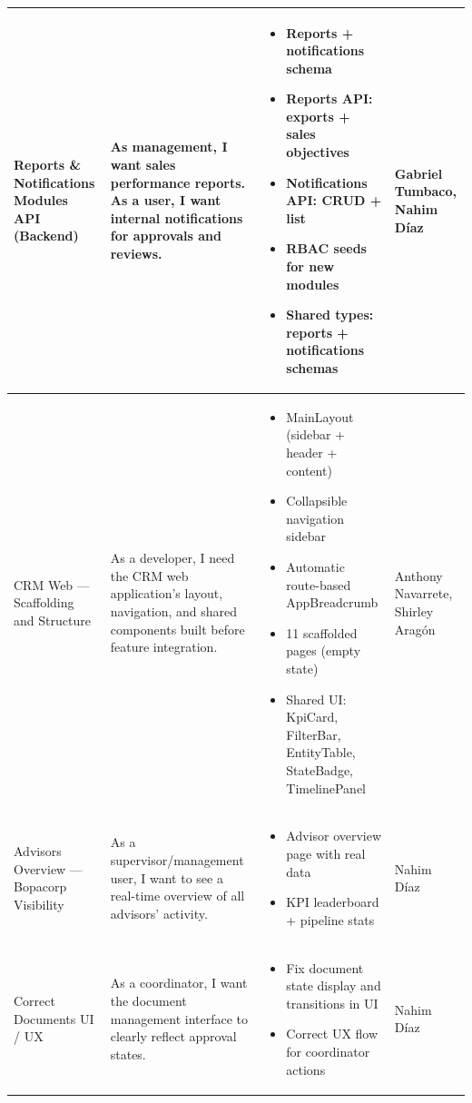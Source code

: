 \documentclass[letterpaper%
, oneside%
, 12pt%
, memoireprojet%
, english%
,creativecommons,hyperref, withAlgo2e %
]{thETS}
\begin{document}
\begin{longtable}{|p{3.2cm}|p{4.4cm}|p{5.4cm}|p{3.0cm}|}
Reports \& Notifications Modules API (Backend) & As management, I want sales performance reports. As a user, I want internal notifications for approvals and reviews. & \begin{itemize}\setlength{\itemsep}{2pt}
    \item Reports + notifications schema
    \item Reports API: exports + sales objectives
    \item Notifications API: CRUD + list
    \item RBAC seeds for new modules
    \item Shared types: reports + notifications schemas
\end{itemize} & Gabriel Tumbaco, Nahim Díaz \\ \hline

CRM Web — Scaffolding and Structure & As a developer, I need the CRM web application's layout, navigation, and shared components built before feature integration. & \begin{itemize}\setlength{\itemsep}{2pt}
    \item MainLayout (sidebar + header + content)
    \item Collapsible navigation sidebar
    \item Automatic route-based AppBreadcrumb
    \item 11 scaffolded pages (empty state)
    \item Shared UI: KpiCard, FilterBar, EntityTable, StateBadge, TimelinePanel
\end{itemize} & Anthony Navarrete, Shirley Aragón \\ \hline

Advisors Overview — Bopacorp Visibility & As a supervisor/management user, I want to see a real-time overview of all advisors' activity. & \begin{itemize}\setlength{\itemsep}{2pt}
    \item Advisor overview page with real data
    \item KPI leaderboard + pipeline stats
\end{itemize} & Nahim Díaz \\ \hline

Correct Documents UI / UX & As a coordinator, I want the document management interface to clearly reflect approval states. & \begin{itemize}\setlength{\itemsep}{2pt}
    \item Fix document state display and transitions in UI
    \item Correct UX flow for coordinator actions
\end{itemize} & Nahim Díaz \\ \hline


\end{longtable}
\end{document}

